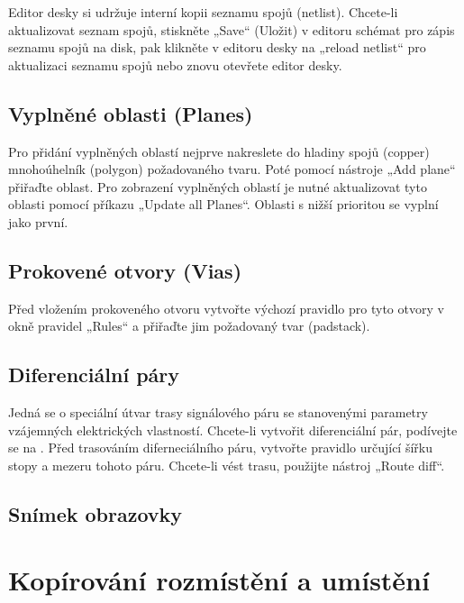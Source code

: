 \documentclass[letterpaper,10pt,czech]{sphinxmanual}
\begin{document}
Editor desky si udržuje interní kopii seznamu spojů (netlist). Chcete-li aktualizovat
seznam spojů, stiskněte „Save“ (Uložit) v editoru schémat pro zápis seznamu spojů na
disk, pak klikněte v editoru desky na „reload netlist“ pro aktualizaci seznamu spojů nebo znovu otevřete editor desky.


\section{Vyplněné oblasti (Planes)}
\label{\detokenize{imp-board:vyplnene-oblasti-planes}}
Pro přidání vyplněných oblastí nejprve nakreslete do hladiny spojů (copper) mnohoúhelník (polygon) požadovaného tvaru. Poté pomocí nástroje „Add plane“ přiřaďte oblast. Pro zobrazení vyplněných oblastí je nutné aktualizovat tyto oblasti pomocí příkazu „Update all Planes“. Oblasti s
nižší prioritou se vyplní jako první.


\section{Prokovené otvory (Vias)}
\label{\detokenize{imp-board:prokovene-otvory-vias}}
Před vložením prokoveného otvoru vytvořte výchozí pravidlo pro tyto otvory v okně pravidel „Rules“
a přiřaďte jim požadovaný tvar (padstack).


\section{Diferenciální páry}
\label{\detokenize{imp-board:diferencialni-pary}}
Jedná se o speciální útvar trasy signálového páru se stanovenými parametry vzájemných elektrických vlastností. Chcete-li vytvořit diferenciální pár, podívejte se na {\hyperref[\detokenize{imp-sch:diferencialni-pary}]{}}. Před trasováním diferneciálního páru, vytvořte pravidlo určující šířku stopy a mezeru tohoto páru. Chcete-li vést trasu, použijte nástroj „Route diff“.


\section{Snímek obrazovky}
\label{\detokenize{imp-board:snimek-obrazovky}}
\noindent{}


\chapter{Kopírování rozmístění a umístění}
\label{\detokenize{copy-layout-placement:kopirovani-rozmisteni-a-umisteni}}\label{\detokenize{copy-layout-placement::doc}}
\end{document}
